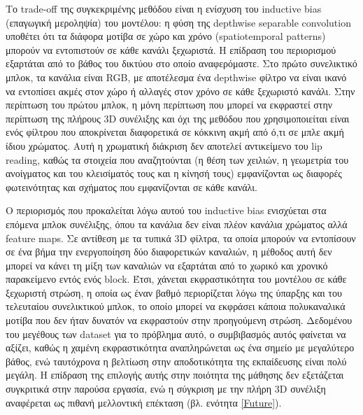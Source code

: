 Το trade-off της συγκεκριμένης μεθόδου είναι η ενίσχυση του inductive bias (επαγωγική μεροληψία) του μοντέλου: η φύση της depthwise separable convolution υποθέτει ότι τα διάφορα μοτίβα σε χώρο και χρόνο (spatiotemporal patterns) μπορούν να εντοπιστούν σε κάθε κανάλι ξεχωριστά. Η επίδραση του περιορισμού εξαρτάται από το βάθος του δικτύου στο οποίο αναφερόμαστε. Στο πρώτο συνελικτικό μπλοκ, τα κανάλια είναι RGB, με αποτέλεσμα ένα depthwise φίλτρο να είναι ικανό να εντοπίσει ακμές στον χώρο ή αλλαγές στον χρόνο σε κάθε ξεχωριστό κανάλι. Στην περίπτωση του πρώτου μπλοκ, η μόνη περίπτωση που μπορεί να εκφραστεί στην περίπτωση της πλήρους 3D συνέλιξης και όχι της μεθόδου που χρησιμοποιείται είναι ενός φίλτρου που αποκρίνεται διαφορετικά σε κόκκινη ακμή από ό,τι σε μπλε ακμή ίδιου χρώματος. Αυτή η χρωματική διάκριση δεν αποτελεί αντικείμενο του lip reading, καθώς τα στοιχεία που αναζητούνται (η θέση των χειλιών, η γεωμετρία του ανοίγματος και του κλεισίματός τους και η κίνησή τους) εμφανίζονται ως διαφορές φωτεινότητας και σχήματος που εμφανίζονται σε κάθε κανάλι.

Ο περιορισμός που προκαλείται λόγω αυτού του inductive bias ενισχύεται στα επόμενα μπλοκ συνέλιξης, όπου τα κανάλια δεν είναι πλέον κανάλια χρώματος αλλά feature maps. Σε αντίθεση με τα τυπικά 3D φίλτρα, τα οποία μπορούν να εντοπίσουν σε ένα βήμα την ενεργοποίηση δύο διαφορετικών καναλιών, η μέθοδος αυτή δεν μπορεί να κάνει τη μίξη των καναλιών να εξαρτάται από το χωρικό και χρονικό παρακείμενο εντός ενός block. Έτσι, χάνεται εκφραστικότητα του μοντέλου σε κάθε ξεχωριστή στρώση, η οποία ως έναν βαθμό περιορίζεται λόγω της ύπαρξης και του τελευταίου συνελικτικού μπλοκ, το οποίο μπορεί να εκφράσει κάποια πολυκαναλικά μοτίβα που δεν ήταν δυνατόν να εκφραστούν στην προηγούμενη στρώση. Δεδομένου του μεγέθους των dataset για το πρόβλημα αυτό, ο συμβιβασμός αυτός φαίνεται να αξίζει, καθώς η χαμένη εκφραστικότητα αναπληρώνεται ως ένα σημείο με μεγαλύτερο βάθος, ενώ ταυτόχρονα η βελτίωση στην αποδοτικότητα της εκπαίδευσης είναι πολύ μεγάλη. Η επίδραση της επιλογής αυτής στην ποιότητα της μάθησης δεν εξετάζεται συγκριτικά στην παρούσα εργασία, ενώ η σύγκριση με την πλήρη 3D συνέλιξη αναφέρεται ως πιθανή μελλοντική επέκταση (βλ. ενότητα \ref{Future}).

